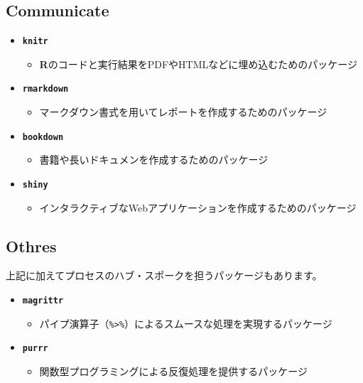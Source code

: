 \documentclass[
  12pt,
]{book}
\providecommand{\tightlist}{%
  \setlength{\itemsep}{0pt}\setlength{\parskip}{0pt}}
\begin{document}
\hypertarget{communicate-1}{%
\subsection*{Communicate}\label{communicate-1}}

\begin{itemize}
\tightlist
\item
  \textbf{\texttt{knitr}}

  \begin{itemize}
  \tightlist
  \item
    \textbf{R}のコードと実行結果をPDFやHTMLなどに埋め込むためのパッケージ\citep{knitr2014, R-knitr}
  \end{itemize}
\item
  \textbf{\texttt{rmarkdown}}

  \begin{itemize}
  \tightlist
  \item
    マークダウン書式を用いてレポートを作成するためのパッケージ\citep{R-rmarkdown}
  \end{itemize}
\item
  \textbf{\texttt{bookdown}}

  \begin{itemize}
  \tightlist
  \item
    書籍や長いドキュメンを作成するためのパッケージ\citep{bookdown2016, R-bookdown}
  \end{itemize}
\item
  \textbf{\texttt{shiny}}

  \begin{itemize}
  \tightlist
  \item
    インタラクティブなWebアプリケーションを作成するためのパッケージ\citep{R-shiny}
  \end{itemize}
\end{itemize}

\hypertarget{othres}{%
\subsection*{Othres}\label{othres}}

上記に加えてプロセスのハブ・スポークを担うパッケージもあります。

\begin{itemize}
\tightlist
\item
  \textbf{\texttt{magrittr}}

  \begin{itemize}
  \tightlist
  \item
    パイプ演算子（\texttt{\%\textgreater{}\%}）によるスムースな処理を実現するパッケージ\citep{R-magrittr}
  \end{itemize}
\item
  \textbf{\texttt{purrr}}

  \begin{itemize}
  \tightlist
  \item
    関数型プログラミングによる反復処理を提供するパッケージ\citep{R-purrr}
  \end{itemize}
\end{itemize}
\end{document}
